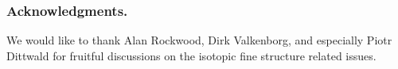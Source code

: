 \subsubsection*{Acknowledgments.}

We would like to thank Alan Rockwood, Dirk Valkenborg, and especially Piotr Dittwald for fruitful discussions on the isotopic fine structure related issues.